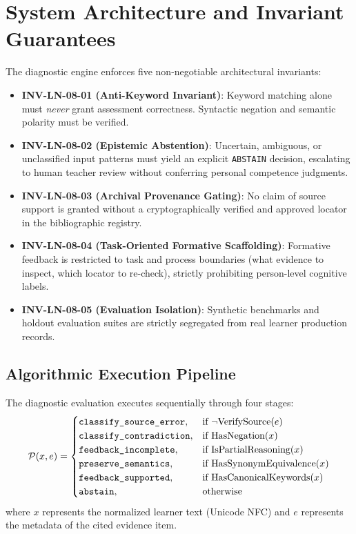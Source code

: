 \documentclass[11pt,a4paper]{article}
\begin{document}
\section{System Architecture and Invariant Guarantees}
The diagnostic engine enforces five non-negotiable architectural invariants:
\begin{itemize}[leftmargin=*]
    \item \textbf{INV-LN-08-01 (Anti-Keyword Invariant)}: Keyword matching alone must \textit{never} grant assessment correctness. Syntactic negation and semantic polarity must be verified.
    \item \textbf{INV-LN-08-02 (Epistemic Abstention)}: Uncertain, ambiguous, or unclassified input patterns must yield an explicit \texttt{ABSTAIN} decision, escalating to human teacher review without conferring personal competence judgments.
    \item \textbf{INV-LN-08-03 (Archival Provenance Gating)}: No claim of source support is granted without a cryptographically verified and approved locator in the bibliographic registry.
    \item \textbf{INV-LN-08-04 (Task-Oriented Formative Scaffolding)}: Formative feedback is restricted to task and process boundaries (what evidence to inspect, which locator to re-check), strictly prohibiting person-level cognitive labels.
    \item \textbf{INV-LN-08-05 (Evaluation Isolation)}: Synthetic benchmarks and holdout evaluation suites are strictly segregated from real learner production records.
\end{itemize}

\subsection{Algorithmic Execution Pipeline}
The diagnostic evaluation executes sequentially through four stages:
\begin{equation}
\mathcal{P}(x, e) = 
\begin{cases}
\text{\texttt{classify\_source\_error}}, & \text{if } \neg \text{VerifySource}(e) \\
\text{\texttt{classify\_contradiction}}, & \text{if } \text{HasNegation}(x) \\
\text{\texttt{feedback\_incomplete}}, & \text{if } \text{IsPartialReasoning}(x) \\
\text{\texttt{preserve\_semantics}}, & \text{if } \text{HasSynonymEquivalence}(x) \\
\text{\texttt{feedback\_supported}}, & \text{if } \text{HasCanonicalKeywords}(x) \\
\text{\texttt{abstain}}, & \text{otherwise}
\end{cases}
\end{equation}
where $x$ represents the normalized learner text (Unicode NFC) and $e$ represents the metadata of the cited evidence item.
\end{document}
